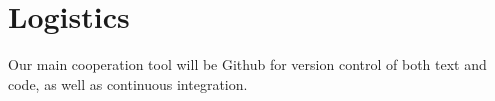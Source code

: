 \section{Logistics}
Our main cooperation tool will be Github for version control of both text and code, as well as continuous integration.
